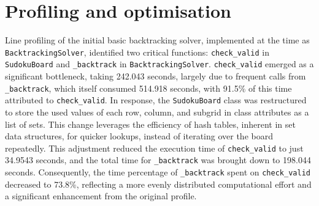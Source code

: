 \documentclass[11pt]{article}
\begin{document}
\section{Profiling and optimisation}
Line profiling of the initial basic backtracking solver, implemented at the time as \texttt{BacktrackingSolver}, identified two critical functions: \texttt{check\_valid} in \texttt{SudokuBoard} and \texttt{\_backtrack} in \texttt{BacktrackingSolver}. \texttt{check\_valid} emerged as a significant bottleneck, taking 242.043 seconds, largely due to frequent calls from \texttt{\_backtrack}, which itself consumed 514.918 seconds, with 91.5\% of this time attributed to \texttt{check\_valid}. In response, the \texttt{SudokuBoard} class was restructured to store the used values of each row, column, and subgrid in class attributes as a list of sets. This change leverages the efficiency of hash tables, inherent in set data structures, for quicker lookups, instead of iterating over the board repeatedly. This adjustment reduced the execution time of \texttt{check\_valid} to just 34.9543 seconds, and the total time for \texttt{\_backtrack} was brought down to 198.044 seconds. Consequently, the time percentage of \texttt{\_backtrack} spent on \texttt{check\_valid} decreased to 73.8\%, reflecting a more evenly distributed computational effort and a significant enhancement from the original profile.
\end{document}
